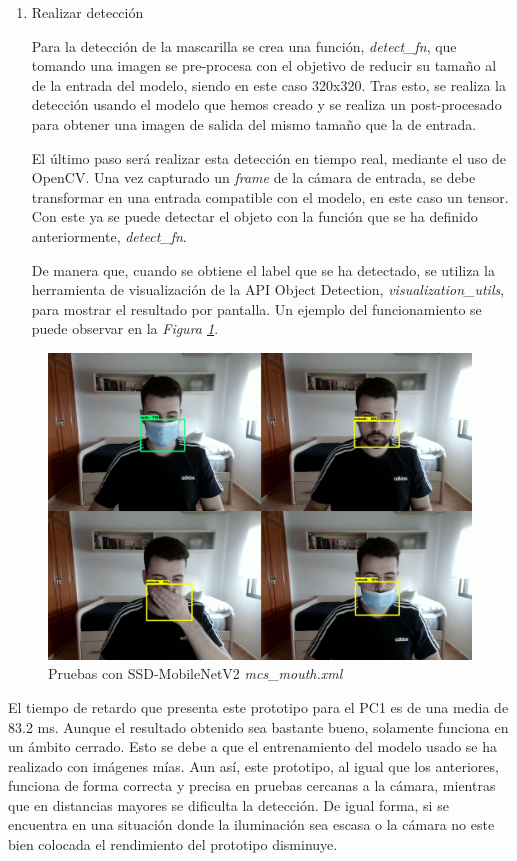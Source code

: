 \begin{enumerate}
	\item Realizar detección
	
	Para la detección de la mascarilla se crea una función, \textit{detect\_fn}, que tomando una imagen se pre-procesa con el objetivo de  reducir su tamaño al de la entrada del modelo, siendo en este caso 320x320. Tras esto, se realiza la detección usando el modelo que hemos creado y se realiza un post-procesado para obtener una imagen de salida del mismo tamaño que la de entrada.
	
	El último paso será realizar esta detección en tiempo real, mediante el uso de OpenCV. Una vez capturado un \textit{frame} de la cámara de entrada, se debe transformar en una entrada compatible con el modelo, en este caso un tensor. Con este ya se puede detectar el objeto con la función que se ha definido anteriormente, \textit{detect\_fn}. 
	
	De manera que, cuando se obtiene el label que se ha detectado, se utiliza la herramienta de visualización de la API Object Detection, \textit{visualization\_utils}, para mostrar el resultado por pantalla. Un ejemplo del funcionamiento se puede observar en la \textit{Figura \ref{fig:protoTensorFlow}}.
\end{enumerate}

\begin{figure}[htp]
	\centering
	\includegraphics[width=12cm]{imagenes/tf_prueba.png}
	\caption{Pruebas con SSD-MobileNetV2 \textit{mcs\_mouth.xml}}
	\label{fig:protoTensorFlow}
\end{figure}

\newpage
El tiempo de retardo que presenta este prototipo para el PC1 es de una media de 83.2 ms. Aunque el resultado obtenido sea bastante bueno, solamente funciona en un ámbito cerrado. Esto se debe a que el entrenamiento del modelo usado se ha realizado con imágenes mías. Aun así, este prototipo, al igual que los anteriores, funciona de forma correcta y precisa en pruebas cercanas a la cámara, mientras que en distancias mayores se dificulta la detección. De igual forma, si se encuentra en una situación donde la iluminación sea escasa o la cámara no este bien colocada el rendimiento del prototipo disminuye.

